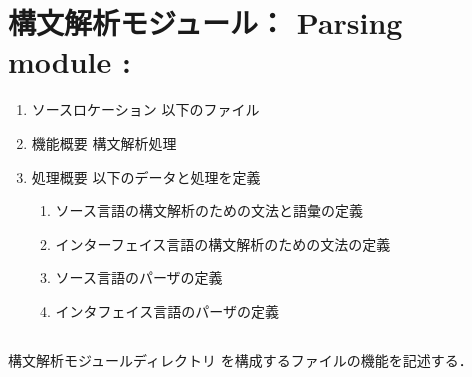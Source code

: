 \chapter{\txt
{構文解析モジュール：}
{Parsing module : }
}
\label{chap:parsing}
\ifjp%
\begin{enumerate}
\item ソースロケーション 以下のファイル
\item 機能概要
	構文解析処理
\item 処理概要
以下のデータと処理を定義
\begin{enumerate}
\item ソース言語の構文解析のための文法と語彙の定義
\item インターフェイス言語の構文解析のための文法の定義
\item ソース言語のパーザの定義
\item インタフェイス言語のパーザの定義
\end{enumerate}
\end{enumerate}
\else%
\fi%


\section{}
\ifjp%
	構文解析モジュールディレクトリ
を構成するファイルの機能を記述する．

